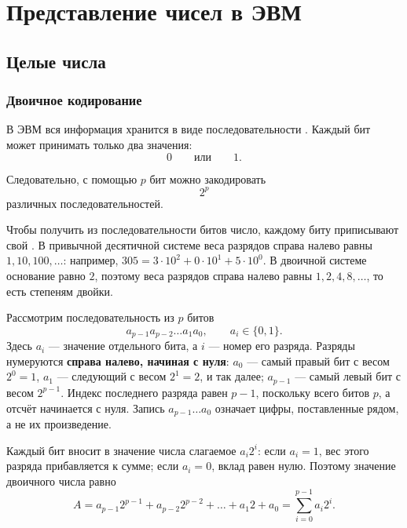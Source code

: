 \documentclass[../final.tex]{subfiles}
\begin{document}

\chapter{Представление чисел в ЭВМ}



\section{Целые числа}

\subsection{Двоичное кодирование}

В ЭВМ вся информация хранится в виде последовательности
. Каждый бит может принимать только два значения:
%
\[
    0
    \qquad \text{или} \qquad
    1.
\]

Следовательно, с помощью $p$ бит можно закодировать
%
\[
    2^p
\]
%
различных последовательностей.

Чтобы получить из последовательности битов число, каждому биту
приписывают свой . В привычной десятичной
системе веса разрядов справа налево равны $1,10,100,\ldots$:
например, $305=3\cdot10^2+0\cdot10^1+5\cdot10^0$.
В двоичной системе основание равно $2$, поэтому веса разрядов
справа налево равны $1,2,4,8,\ldots$, то есть степеням двойки.

Рассмотрим последовательность из $p$ битов
%
\[
    a_{p-1}a_{p-2}\ldots a_1a_0,
    \qquad
    a_i\in\{0,1\}.
\]
%
Здесь $a_i$ --- значение отдельного бита, а $i$ --- номер его
разряда. Разряды нумеруются \textbf{справа налево, начиная с нуля}:
$a_0$ --- самый правый бит с весом $2^0=1$,
$a_1$ --- следующий с весом $2^1=2$, и так далее;
$a_{p-1}$ --- самый левый бит с весом $2^{p-1}$.
Индекс последнего разряда равен $p-1$, поскольку всего битов $p$,
а отсчёт начинается с нуля. Запись $a_{p-1}\ldots a_0$ означает
цифры, поставленные рядом, а не их произведение.

Каждый бит вносит в значение числа слагаемое $a_i2^i$:
если $a_i=1$, вес этого разряда прибавляется к сумме;
если $a_i=0$, вклад равен нулю. Поэтому значение двоичного числа равно
%
\begin{equation*}
    A
    =
    a_{p-1}2^{p-1}
    +
    a_{p-2}2^{p-2}
    +\ldots+
    a_1 2
    +
    a_0
    =
    \sum_{i=0}^{p-1} a_i2^i.
\end{equation*}
\end{document}
